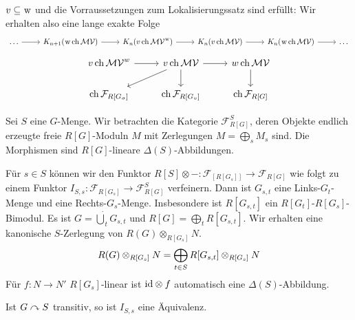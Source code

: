 \begin{bemerkung}[label=bem:diagramm_beweis]
	$v \subseteq \mkern1mu\mathrm{w}$ und die Vorraussetzungen zum Lokalisierungssatz sind erfüllt: Wir erhalten also eine lange exakte Folge 
	\[
		\begin{tikzcd}
			\ldots \rar & K_{n+1}(\w \ch \mathcal{MV}) \rar & K_n(v \ch \mathcal{MV}^{\w}) \rar & K_n( v \ch \mathcal{MV}) \rar & K_n(\w \ch \mathcal{MV}) \rar & \ldots 
		\end{tikzcd}
	\]
	\[
		\begin{tikzcd}
			v \ch \mathcal{MV}^w \rar & v \ch \mathcal{MV} \rar  \dar \dlar& w \ch \mathcal{MV} \dar \\
			\ch \mathcal{F}_{R[G_\sigma]} & \ch \mathcal{F}_{R[G_v]} & \ch \mathcal{F}_{R[G]}
		\end{tikzcd}
	\]
\end{bemerkung}

\begin{bemerkung}
	Sei $S$ eine $G$-Menge.
	Wir betrachten die Kategorie $\mathcal{F}_{R[G]}^S$, deren Objekte endlich erzeugte freie $R[G]$-Moduln $M$ mit Zerlegungen $M = \bigoplus_s M_s$ sind.
	Die Morphismen sind $R[G]$-lineare $\Delta(S)$-Abbildungen.
	
	Für $s \in S$ können wir den Funktor $R[S] \otimes{ -} \colon \mathcal{F}_[{R[G_s]}] \to \mathcal{F}_{R[G]}$ wie folgt zu einem Funktor $I_{S,s} \colon \mathcal{F}_{R[G_s]} \to \mathcal{F}_{R[G]}^S$ verfeinern.
	Dann ist $G_{s,t}$ eine Links-$G_t$-Menge und eine Rechts-$G_s$-Menge.
	Insbesondere ist $R[G_{s,t}]$ ein $R[G_t]$-$R[G_s]$-Bimodul.
	Es ist $G = \dot{\bigcup}_t G_{s,t}$ und $R[G] = \bigoplus_t R[G_{s,t}]$.
	Wir erhalten eine kanonische $S$-Zerlegung von $R(G) \otimes_{R[G_s]}  N$.
	\[
		R(G) \otimes_{R[G_s]}  N = \bigoplus_{t \in S} R \benbrace*{G_{s,t}} \otimes_{R[G_s]} N
	\]
	Für $f \colon N \to N'$ $R[G_s]$-linear ist ${\operatorname{id}} \otimes f$ automatisch eine $\Delta(S)$-Abbildung.
\end{bemerkung}

\begin{bemerkung}
	Ist $G \curvearrowright S$ transitiv, so ist $I_{S,s}$ eine Äquivalenz.
\end{bemerkung}

